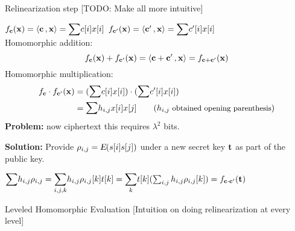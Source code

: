 \def\c{\vect{c}}
\def\cp{\vect{c'}}
\def\fc{f_{\c}}
\def\fcp{f_{\cp}}
\def\x{\vect{x}}

\begin{frame}{Relinearization step}
[TODO: Make all more intuitive]

 $  \fc(\x) = \inprod{\c}{\vect{x}} = \Sum c[i] x[i]$ \quad\quad\quad
 $  \fcp(\x) = \inprod{\cp}{\vect{x}} = \Sum c'[i] x[i]$
  \pause\\
 \medskip
 Homomorphic addition:
$$ \fc(\x)+\fcp(\x) = \inprod{\c+\cp}{\vect{x}}  = f_{\c+\cp}(\x) $$ 
\medskip 
\pause
Homomorphic multiplication:
 \begin{align*}
 \fc\cdot\fcp(\x)  & =   (\Sum c[i] x[i]) \cdot (\Sum c'[i]x[i]) \\
        				 & =  \Sum h_{i,j} x[i]x[j]   \quad\quad \small{( h_{i,j} \text{ obtained opening parenthesis})}
\end{align*}
\pause
\textbf{Problem:} now ciphertext this requires $\lambda^2$ bits.\pause

\textbf{Solution:} Provide $\mathbf{\rho}_{i,j} = {\textsl{E}}(s[i]s[j])$ under a new secret key $\mathbf{t}$ as part of the public key.\pause
 
$
  \Sum h_{i,j} \vect{\rho}_{i,j}  %
=  \Sum_{i,j,k} h_{i,j} \rho_{i,j}[k] t[k] = \Sum_k t[k](\sum_{i,j} h_{i,j} \rho_{i,j}[k]) = f_{\c\cdot\cp}(\vect{t})
$
 
\end{frame}

\begin{frame}{Leveled Homomorphic Evaluation}
	[Intuition on doing relinearization at every level]
\end{frame}